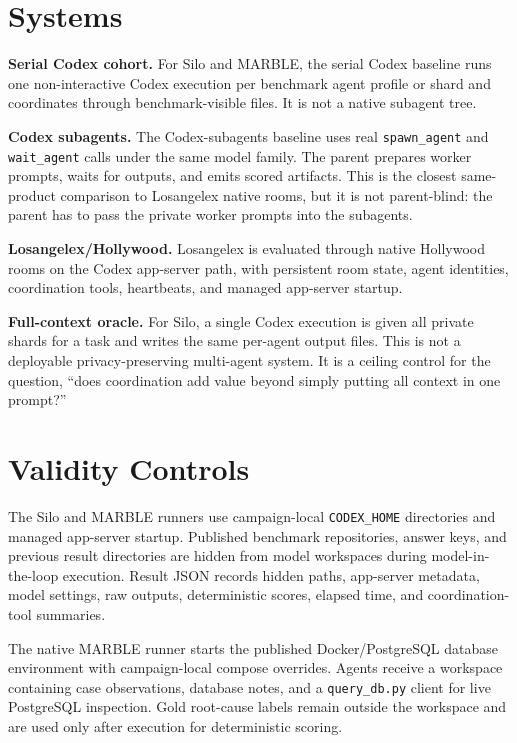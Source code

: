 \documentclass[10pt,twocolumn]{article}
\begin{document}
\section{Systems}

\textbf{Serial Codex cohort.} For Silo and MARBLE, the serial Codex baseline runs one non-interactive Codex execution per benchmark agent profile or shard and coordinates through benchmark-visible files. It is not a native subagent tree.

\textbf{Codex subagents.} The Codex-subagents baseline uses real \texttt{spawn\_agent} and \texttt{wait\_agent} calls under the same model family. The parent prepares worker prompts, waits for outputs, and emits scored artifacts. This is the closest same-product comparison to Losangelex native rooms, but it is not parent-blind: the parent has to pass the private worker prompts into the subagents.

\textbf{Losangelex/Hollywood.} Losangelex is evaluated through native Hollywood rooms on the Codex app-server path, with persistent room state, agent identities, coordination tools, heartbeats, and managed app-server startup.

\textbf{Full-context oracle.} For Silo, a single Codex execution is given all private shards for a task and writes the same per-agent output files. This is not a deployable privacy-preserving multi-agent system. It is a ceiling control for the question, ``does coordination add value beyond simply putting all context in one prompt?''

\section{Validity Controls}

The Silo and MARBLE runners use campaign-local \texttt{CODEX\_HOME} directories and managed app-server startup. Published benchmark repositories, answer keys, and previous result directories are hidden from model workspaces during model-in-the-loop execution. Result JSON records hidden paths, app-server metadata, model settings, raw outputs, deterministic scores, elapsed time, and coordination-tool summaries.

The native MARBLE runner starts the published Docker/PostgreSQL database environment with campaign-local compose overrides. Agents receive a workspace containing case observations, database notes, and a \texttt{query\_db.py} client for live PostgreSQL inspection. Gold root-cause labels remain outside the workspace and are used only after execution for deterministic scoring.
\end{document}

